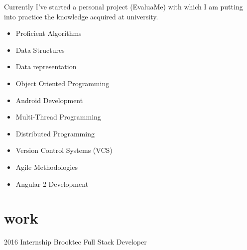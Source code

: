\documentclass[]{friggeri-cv} %
\begin{document}
        Currently I've started a personal project (EvaluaMe) with which I am putting into practice the knowledge acquired at university.

        \noindent\begin{minipage}[t]{0.5\linewidth}
            \begin{itemize}
            	\item{Proficient Algorithms}
        	\item{Data Structures}
            	\item{Data representation}
            	\item{Object Oriented Programming}
            	\item{Android Development}

            \end{itemize}
            \end{minipage}%
            \begin{minipage}[t]{0.5\linewidth}
            \begin{itemize}
            	\item{Multi-Thread Programming}
            	\item{Distributed Programming}
           	\item{Version Control Systems (VCS)}
            \item{Agile Methodologies}
            \item{Angular 2 Development}
            \end{itemize}
        \end{minipage}\par\bigskip




    \section{work}

        \begin{entrylist}

            \entry
            {2016}
            {Internship}
            {Brooktec}
            {Full Stack Developer}

        \end{entrylist}
\end{document}
